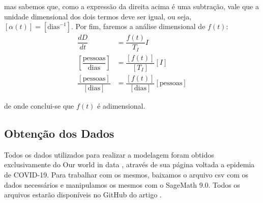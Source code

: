 \documentclass{article}
\begin{document}
	\noindent mas sabemos que, como a expressão da direita acima é uma subtração, vale que a unidade dimensional dos dois termos deve ser igual, ou seja, $[\alpha(t)] = [\text{dias}^{-1}]$. Por fim, faremos a análise dimensional de $f(t)$:
	\begin{equation*}
		\begin{split}
			\dfrac{dD}{dt} & = \dfrac{f(t)}{T_I}I \\
			\left[\dfrac{\text{pessoas}}{\text{dias}}\right] & = \dfrac{[f(t)]}{[T_I]}[I] \\
			\dfrac{[\text{pessoas}]}{[\text{dias}]} & = \dfrac{[f(t)]}{[\text{dias}]}[\text{pessoas}]
		\end{split}
	\end{equation*}
	
	\noindent de onde conclui-se que $f(t)$ é adimensional.
	
	\subsection{Obtenção dos Dados}
	
	Todos os dados utilizados para realizar a modelagem foram obtidos exclusivamente do Our world in data \cite{owid}, através de sua página voltada a epidemia de COVID-19. Para trabalhar com os mesmos, baixamos o arquivo csv com os dados necessários e manipulamos os mesmos com o SageMath 9.0. Todos os arquivos estarão disponíveis no GitHub do artigo \cite{github}.
	
	\printbibliography
	
\end{document}
